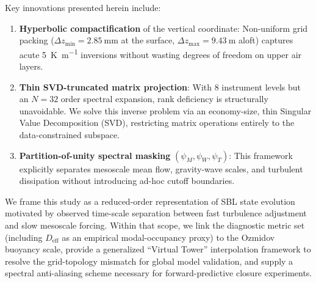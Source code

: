 Key innovations presented herein include:
\begin{enumerate}
    \item \textbf{Hyperbolic compactification} of the vertical coordinate: Non-uniform grid packing ($\Delta z_{\min} = \SI{2.85}{\milli\meter}$ at the surface, $\Delta z_{\max} = \SI{9.43}{\meter}$ aloft) captures acute \SI{5}{\kelvin\per\meter} inversions without wasting degrees of freedom on upper air layers.
    \item \textbf{Thin SVD-truncated matrix projection}: With 8 instrument levels but an $N=32$ order spectral expansion, rank deficiency is structurally unavoidable. We solve this inverse problem via an economy-size, thin Singular Value Decomposition (SVD), restricting matrix operations entirely to the data-constrained subspace.
    \item \textbf{Partition-of-unity spectral masking} $(\psi_M, \psi_W, \psi_T)$: This framework explicitly separates mesoscale mean flow, gravity-wave scales, and turbulent dissipation without introducing ad-hoc cutoff boundaries.
\end{enumerate}

We frame this study as a reduced-order representation of SBL state evolution motivated by observed time-scale separation between fast turbulence adjustment and slow mesoscale forcing. Within that scope, we link the diagnostic metric set (including $D_{\mathrm{eff}}$ as an empirical modal-occupancy proxy) to the Ozmidov buoyancy scale, provide a generalized ``Virtual Tower'' interpolation framework to resolve the grid-topology mismatch for global model validation, and supply a spectral anti-aliasing scheme necessary for forward-predictive closure experiments.